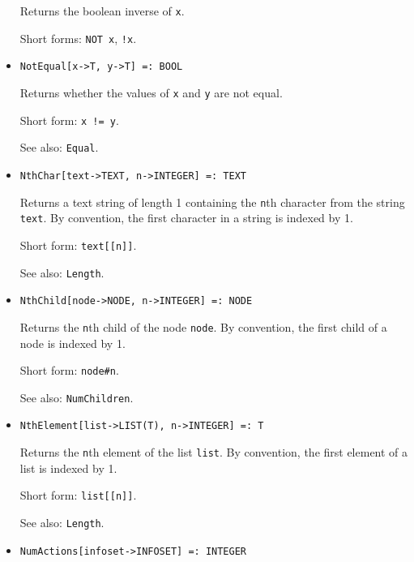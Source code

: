 \begin{itemize}
\bd
Returns the boolean inverse of \verb+x+.
\item
[Short forms:] \verb+NOT x+, \verb+!x+.
\ed

\item
\protect \large \begin{verbatim}
NotEqual[x->T, y->T] =: BOOL
\end{verbatim}\normalsize

\bd
Returns whether the values of \verb+x+ and \verb+y+ are
not equal.
\item
[Short form:] \verb+x != y+.
\item
[See also:] {\tt Equal}.
\ed

\item
\protect \large \begin{verbatim}
NthChar[text->TEXT, n->INTEGER] =: TEXT
\end{verbatim}\normalsize

\bd
Returns a text string of length 1 containing the \verb+n+th
character from the string \verb+text+.  By convention, the first character
in a string is indexed by 1.
\item
[Short form:] \verb+text[[n]]+.
\item
[See also:] {\tt Length}.
\ed

\item
\protect \large \begin{verbatim} 
NthChild[node->NODE, n->INTEGER] =: NODE
\end{verbatim}\normalsize

\bd
Returns the \verb+n+th child of the node \verb+node+.
By convention, the first child of a node is indexed by 1.
\item
[Short form:] \verb+node#n+.
\item
[See also:] {\tt NumChildren}.
\ed

\item
\protect \large \begin{verbatim}
NthElement[list->LIST(T), n->INTEGER] =: T 
\end{verbatim}\normalsize

\bd
Returns the \verb+n+th element of the list \verb+list+.
By convention, the first element of a list is indexed by 1.
\item
[Short form:] \verb+list[[n]]+.
\item
[See also:] {\tt Length}.
\ed

\item
\protect \large \begin{verbatim}
NumActions[infoset->INFOSET] =: INTEGER
\end{verbatim}\normalsize


\end{itemize}
